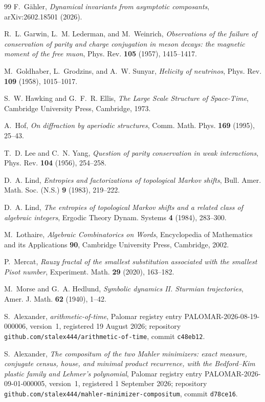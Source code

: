 \documentclass[11pt]{amsart}
\theoremstyle{plain}
\theoremstyle{definition}
\theoremstyle{remark}
\begin{document}
\begin{thebibliography}{99}
F.~G\"ahler,
\emph{Dynamical invariants from asymptotic composants},
arXiv:2602.18501 (2026).

R.~L. Garwin, L.~M. Lederman, and M.~Weinrich,
\emph{Observations of the failure of conservation of parity and charge conjugation in meson
decays: the magnetic moment of the free muon},
Phys. Rev. \textbf{105} (1957), 1415--1417.

M.~Goldhaber, L.~Grodzins, and A.~W. Sunyar,
\emph{Helicity of neutrinos},
Phys. Rev. \textbf{109} (1958), 1015--1017.

S.~W. Hawking and G.~F.~R. Ellis,
\emph{The Large Scale Structure of Space-Time},
Cambridge University Press, Cambridge, 1973.

A.~Hof,
\emph{On diffraction by aperiodic structures},
Comm. Math. Phys. \textbf{169} (1995), 25--43.

T.~D. Lee and C.~N. Yang,
\emph{Question of parity conservation in weak interactions},
Phys. Rev. \textbf{104} (1956), 254--258.

D.~A. Lind,
\emph{Entropies and factorizations of topological Markov shifts},
Bull. Amer. Math. Soc. (N.S.) \textbf{9} (1983), 219--222.

D.~A. Lind,
\emph{The entropies of topological Markov shifts and a related class of algebraic integers},
Ergodic Theory Dynam. Systems \textbf{4} (1984), 283--300.

M.~Lothaire,
\emph{Algebraic Combinatorics on Words},
Encyclopedia of Mathematics and its Applications \textbf{90},
Cambridge University Press, Cambridge, 2002.

P.~Mercat,
\emph{Rauzy fractal of the smallest substitution associated with the smallest Pisot number},
Experiment. Math. \textbf{29} (2020), 163--182.

M.~Morse and G.~A. Hedlund,
\emph{Symbolic dynamics II. Sturmian trajectories},
Amer. J. Math. \textbf{62} (1940), 1--42.

S.~Alexander,
\emph{arithmetic-of-time},
Palomar registry entry PALOMAR-2026-08-19-000006, version~1, registered 19 August 2026;
repository \texttt{github.com/stalex444/arithmetic-of-time}, commit \texttt{c48eb12}.

S.~Alexander,
\emph{The compositum of the two Mahler minimizers: exact measure, conjugate census, house,
and minimal product recurrence, with the Bedford--Kim plastic family and Lehmer's
polynomial},
Palomar registry entry PALOMAR-2026-09-01-000005, version~1, registered 1 September 2026;
repository \texttt{github.com/stalex444/mahler-minimizer-compositum}, commit
\texttt{d78ce16}.


\end{thebibliography}
\end{document}
